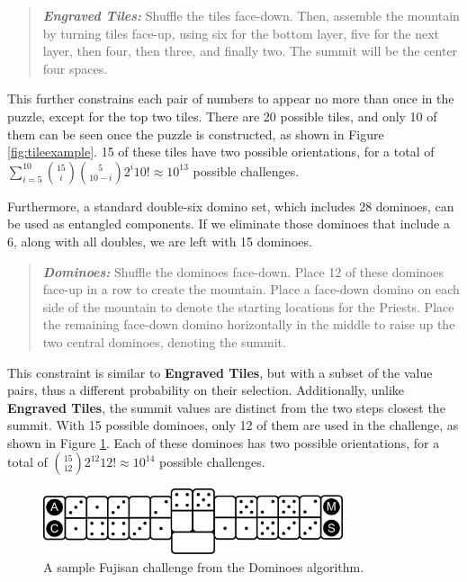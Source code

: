 \documentclass[journal]{IEEEtran}
\begin{document}
\begin{quote}
    
  {\it \bf Engraved Tiles:} Shuffle the tiles face-down. Then, assemble the mountain by turning tiles face-up, using six for the bottom layer, five for the next layer, then four, then three, and finally two. The summit will be the center four spaces.
\end{quote}

This further constrains each pair of numbers to appear no more than once in the puzzle, except for the top two tiles. There are 20 possible tiles, and only 10 of them can be seen once the puzzle is constructed, as shown in Figure \ref{fig:tileexample}. 15 of these tiles have two possible orientations, for a total of $\sum_{i = 5}^{10}{15 \choose i}\binom{5}{10 - i}2^{i}10! \approx 10^{13}
$ possible challenges.

Furthermore, a standard double-six domino set, which includes 28 dominoes, 
can be used as entangled components. If we eliminate those dominoes that include a 6, along with all doubles, we are left with 15 dominoes. 

\begin{quote}
    
  {\it \bf Dominoes:} Shuffle the dominoes face-down. Place 12 of these dominoes face-up in a row to create the mountain. Place a face-down domino on each side of the mountain to denote the starting locations for the Priests. Place the remaining face-down domino horizontally in the middle to raise up the two central dominoes, denoting the summit.
\end{quote}

This constraint is similar to \textbf{Engraved Tiles}, but with a subset of the value pairs, thus a different probability on their selection.  Additionally, unlike \textbf{Engraved Tiles}, the summit values are distinct from the two steps closest the summit.
With 15 possible dominoes, only 12 of them are used in the challenge, as shown in Figure \ref{fig:dominoexample}. Each of these dominoes has two possible orientations, for a total of ${15 \choose 12}2^{12}12! \approx 10^{14}$ possible challenges. 

\begin{figure}[b]
\includegraphics[width=8.8cm]{figure15.png}
\caption{A sample Fujisan challenge from the Dominoes algorithm.}
\label{fig:dominoexample}
\end{figure}
\end{document}
